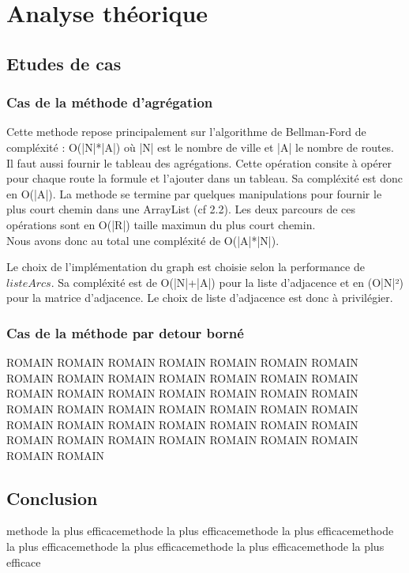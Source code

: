 \chapter{Analyse théorique}
\section{Etudes de cas}
\subsection{Cas de la méthode d'agrégation}

Cette methode repose principalement sur l'algorithme de Bellman-Ford de compléxité : O(|N|*|A|) où |N| est le nombre de ville et |A| le nombre de routes.
Il faut aussi fournir le tableau des agrégations. Cette opération consite à opérer pour chaque route la formule et l'ajouter dans un tableau. Sa compléxité est donc en O(|A|).
La methode se termine par quelques manipulations pour fournir le plus court chemin dans une ArrayList (cf 2.2). Les deux parcours de ces opérations sont en O(|R|) taille maximun du plus court chemin.
\\
Nous avons donc au total une compléxité de O(|A|*|N|).

Le choix de l'implémentation du graph est choisie selon la performance de $listeArcs$. Sa compléxité est de O(|N|+|A|) pour la liste d'adjacence et en (O|N|²) pour la matrice d'adjacence. Le choix de liste d'adjacence est donc à privilégier.

\subsection{Cas de la méthode par detour borné}
 ROMAIN ROMAIN ROMAIN ROMAIN ROMAIN ROMAIN ROMAIN ROMAIN ROMAIN ROMAIN ROMAIN ROMAIN ROMAIN ROMAIN ROMAIN ROMAIN ROMAIN ROMAIN ROMAIN ROMAIN ROMAIN ROMAIN ROMAIN ROMAIN ROMAIN ROMAIN ROMAIN ROMAIN ROMAIN ROMAIN ROMAIN ROMAIN ROMAIN ROMAIN ROMAIN ROMAIN ROMAIN ROMAIN ROMAIN ROMAIN ROMAIN ROMAIN ROMAIN ROMAIN

\section{Conclusion}%
methode la plus efficacemethode la plus efficacemethode la plus efficacemethode la plus efficacemethode la plus efficacemethode la plus efficacemethode la plus efficace


\clearpage


